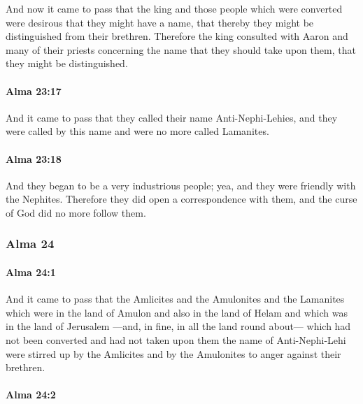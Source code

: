 			And now it came to pass that
			the king and those people which were converted were desirous
			that they might have a name,
			that thereby they might be distinguished from their brethren.
			Therefore the king consulted with Aaron and many of their priests
			concerning the name that they should take upon them,
			that they might be distinguished.

		\paragraph{Alma 23:17} %
			\label{ALMA-23-17}

			And it came to pass that they called their name Anti-Nephi-Lehies,
			and they were called by this name and were no more called Lamanites.

		\paragraph{Alma 23:18} %
			\label{ALMA-23-18}

			And they began to be a very industrious people;
			yea, and they were friendly with the Nephites.
			Therefore they did open a correspondence with them,
			and the curse of God did no more follow them.

	\subsubsection{Alma 24} %
		\label{ALMA-24}
		
		\paragraph{Alma 24:1} %
			\label{ALMA-24-1}

			And it came to pass that the Amlicites and the Amulonites and the Lamanites
			which were in the land of Amulon and also in the land of Helam
			and which was in the land of Jerusalem
			---and, in fine, in all the land round about---
			which had not been converted
			and had not taken upon them the name of Anti-Nephi-Lehi
			were stirred up by the Amlicites and by the Amulonites
			to anger against their brethren.

		\paragraph{Alma 24:2} %
			\label{ALMA-24-2}

